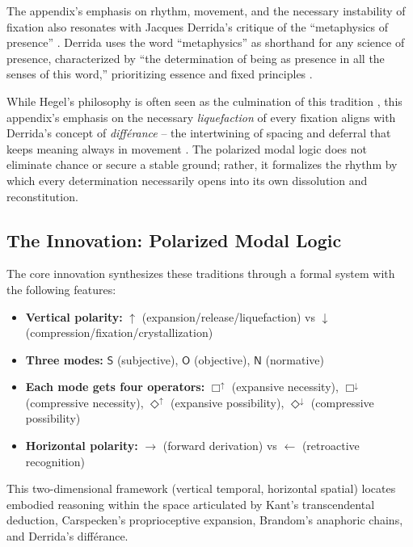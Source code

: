 \documentclass[12pt]{book}
\begin{document}
The appendix's emphasis on rhythm, movement, and the necessary instability of fixation also resonates with Jacques Derrida's critique of the ``metaphysics of presence'' \parencite{Derrida2011}. Derrida uses the word ``metaphysics'' as shorthand for any science of presence, characterized by ``the determination of being as presence in all the senses of this word,'' prioritizing essence and fixed principles \parencite[p. xxi]{Derrida1997}.

While Hegel's philosophy is often seen as the culmination of this tradition \parencite{Derrida:1973, agamben_language_2006}, this appendix's emphasis on the necessary \textit{liquefaction} of every fixation aligns with Derrida's concept of \textit{différance} -- the intertwining of spacing and deferral that keeps meaning always in movement \parencite{Derrida:1973}. The polarized modal logic does not eliminate chance or secure a stable ground; rather, it formalizes the rhythm by which every determination necessarily opens into its own dissolution and reconstitution.

\subsection{The Innovation: Polarized Modal Logic}

The core innovation synthesizes these traditions through a formal system with the following features:

\begin{itemize}
\item \textbf{Vertical polarity:} $\uparrow$ (expansion/release/liquefaction) vs $\downarrow$ (compression/fixation/crystallization)
\item \textbf{Three modes:} $\mathsf{S}$ (subjective), $\mathsf{O}$ (objective), $\mathsf{N}$ (normative)
\item \textbf{Each mode gets four operators:} $\Box^{\uparrow}$ (expansive necessity), $\Box^{\downarrow}$ (compressive necessity), $\Diamond^{\uparrow}$ (expansive possibility), $\Diamond^{\downarrow}$ (compressive possibility)
\item \textbf{Horizontal polarity:} $\rightarrow$ (forward derivation) vs $\leftarrow$ (retroactive recognition)
\end{itemize}

This two-dimensional framework (vertical temporal, horizontal spatial) locates embodied reasoning within the space articulated by Kant's transcendental deduction, Carspecken's proprioceptive expansion, Brandom's anaphoric chains, and Derrida's différance.
\end{document}
